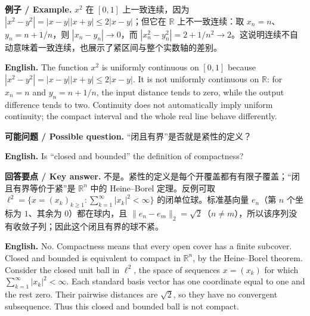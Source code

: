 \documentclass[UTF8,11pt,a4paper]{ctexart}
\newcommand{\EN}[1]{\par\noindent\textbf{English.} #1\par}
\newcommand{\EX}[2]{\par\noindent\textbf{例子 / Example.} #1\par\EN{#2}}
\newcommand{\ASK}[4]{\par\noindent\textbf{可能问题 / Possible question.} #1\par\EN{#2}\noindent\textbf{回答要点 / Key answer.} #3\par\EN{#4}\medskip}
\begin{document}
\EX{$x^2$ 在 $[0,1]$ 上一致连续，因为 $|x^2-y^2|=|x-y||x+y|\le2|x-y|$；但它在 $\mathbb R$ 上不一致连续：取 $x_n=n$、$y_n=n+1/n$，则 $|x_n-y_n|\to0$，而 $|x_n^2-y_n^2|=2+1/n^2\to2$。这说明连续不自动意味着一致连续，也展示了紧区间与整个实数轴的差别。}{The function $x^2$ is uniformly continuous on $[0,1]$ because $|x^2-y^2|=|x-y||x+y|\le2|x-y|$. It is not uniformly continuous on $\mathbb R$: for $x_n=n$ and $y_n=n+1/n$, the input distance tends to zero, while the output difference tends to two. Continuity does not automatically imply uniform continuity; the compact interval and the whole real line behave differently.}
\ASK{“闭且有界”是否就是紧性的定义？}{Is “closed and bounded” the definition of compactness?}{不是。紧性的定义是每个开覆盖都有有限子覆盖；“闭且有界等价于紧”是 $\mathbb R^n$ 中的 Heine--Borel 定理。反例可取 $\ell^2=\{x=(x_k)_{k\ge1}:\sum_{k=1}^{\infty}|x_k|^2<\infty\}$ 的闭单位球。标准基向量 $e_n$（第 $n$ 个坐标为 $1$、其余为 $0$）都在球内，且 $\|e_n-e_m\|_2=\sqrt2$（$n\ne m$），所以该序列没有收敛子列；因此这个闭且有界的球不紧。}{No. Compactness means that every open cover has a finite subcover. Closed and bounded is equivalent to compact in $\mathbb R^n$, by the Heine--Borel theorem. Consider the closed unit ball in $\ell^2$, the space of sequences $x=(x_k)$ for which $\sum_{k=1}^{\infty}|x_k|^2<\infty$. Each standard basis vector has one coordinate equal to one and the rest zero. Their pairwise distances are $\sqrt2$, so they have no convergent subsequence. Thus this closed and bounded ball is not compact.}
\end{document}
